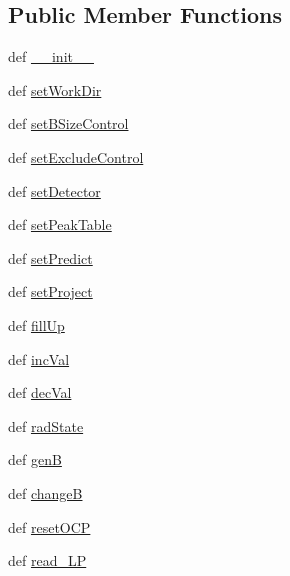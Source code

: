 \subsection*{Public Member Functions}
\begin{DoxyCompactItemize}
\item 
def \hyperlink{classsimulate_dlg_1_1simulate_dlg_a30e20ab290a85ace9b9f1aa244d7c474}{\-\_\-\-\_\-init\-\_\-\-\_\-}
\item 
def \hyperlink{classsimulate_dlg_1_1simulate_dlg_ae8ad62465bea76aeb7ced4d34d8ca56a}{set\-Work\-Dir}
\item 
def \hyperlink{classsimulate_dlg_1_1simulate_dlg_a53b3c5047a7a281b5baeec7135492591}{set\-B\-Size\-Control}
\item 
def \hyperlink{classsimulate_dlg_1_1simulate_dlg_a97123c1f3e8b1b340dc382a6fd86a101}{set\-Exclude\-Control}
\item 
def \hyperlink{classsimulate_dlg_1_1simulate_dlg_abe6b4f3fef4b78d2c7a2555727653de1}{set\-Detector}
\item 
def \hyperlink{classsimulate_dlg_1_1simulate_dlg_a3087ff8625ca2596757a04e8d57c6aef}{set\-Peak\-Table}
\item 
def \hyperlink{classsimulate_dlg_1_1simulate_dlg_ac656f0af5fb6ead3d58c3a79cbe90453}{set\-Predict}
\item 
def \hyperlink{classsimulate_dlg_1_1simulate_dlg_afc7435e2812554e7059d3d9e908183ff}{set\-Project}
\item 
def \hyperlink{classsimulate_dlg_1_1simulate_dlg_a251194e1c458621e24fdfdeb409342c6}{fill\-Up}
\item 
def \hyperlink{classsimulate_dlg_1_1simulate_dlg_a8d07b8b8fbaebf05066a368ef55d1c3e}{inc\-Val}
\item 
def \hyperlink{classsimulate_dlg_1_1simulate_dlg_a686a9c2d3206667c4f54f742537dc0f4}{dec\-Val}
\item 
def \hyperlink{classsimulate_dlg_1_1simulate_dlg_ae7f76a72f48eadc2aa799a2a2a66c24f}{rad\-State}
\item 
def \hyperlink{classsimulate_dlg_1_1simulate_dlg_a9c525e6091e98de8f7da2fa5390e7f45}{gen\-B}
\item 
def \hyperlink{classsimulate_dlg_1_1simulate_dlg_a5420da8b718295dec6996e3af575d009}{change\-B}
\item 
def \hyperlink{classsimulate_dlg_1_1simulate_dlg_ab5bf1b8be44923ad6767d7b26e24dfba}{reset\-O\-C\-P}
\item 
def \hyperlink{classsimulate_dlg_1_1simulate_dlg_a36b13c633095fd1b37a8c24bdc9feb02}{read\-\_\-\-L\-P}

\end{DoxyCompactItemize}
